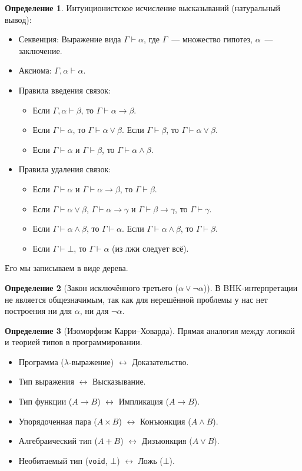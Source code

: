 \documentclass[a4paper,11pt]{article}
\theoremstyle{definition}
\newtheorem*{dfn}{Определение}
\newcommand{\proves}{\vdash}
\begin{document}
\begin{dfn}
Интуиционистское исчисление высказываний (натуральный вывод):
\begin{itemize}
\item Секвенция: Выражение вида $\Gamma \proves \alpha$, где $\Gamma$~---
  множество гипотез, $\alpha$~--- заключение.
\item Аксиома: $\Gamma, \alpha \proves \alpha$.
\item Правила введения связок:
  \begin{itemize}
  \item Если $\Gamma, \alpha \proves \beta$, то $\Gamma \proves \alpha \to \beta$.
  \item Если $\Gamma \proves \alpha$, то $\Gamma \proves \alpha \vee \beta$. Если
    $\Gamma \proves \beta$, то $\Gamma \proves \alpha \vee \beta$.
  \item Если $\Gamma \proves \alpha$ и $\Gamma \proves \beta$, то $\Gamma
    \proves \alpha \wedge \beta$.
  \end{itemize}
\item Правила удаления связок:
  \begin{itemize}
  \item Если $\Gamma \proves \alpha$ и $\Gamma \proves \alpha \to \beta$, то
    $\Gamma \proves \beta$.
  \item Если $\Gamma \proves \alpha \vee \beta$, $\Gamma \proves \alpha \to
    \gamma$ и $\Gamma \proves \beta \to \gamma$, то $\Gamma \proves \gamma$.
  \item Если $\Gamma \proves \alpha \wedge \beta$, то $\Gamma \proves \alpha$.
    Если $\Gamma \proves \alpha \wedge \beta$, то $\Gamma \proves \beta$.
  \item Если $\Gamma \proves \bot$, то $\Gamma \proves \alpha$ (из лжи следует
    всё).
  \end{itemize}
\end{itemize}
Его мы записываем в виде дерева.
\end{dfn}
\begin{dfn}[Закон исключённого третьего ($\alpha \vee \neg\alpha$)]
В BHK-интерпретации не является общезначимым, так как для нерешённой проблемы у
нас нет построения ни для $\alpha$, ни для $\neg\alpha$.
\end{dfn}
\begin{dfn}[Изоморфизм Карри--Ховарда]
Прямая аналогия между логикой и теорией типов в программировании.
\begin{itemize}
\item Программа ($\lambda$-выражение) $\leftrightarrow$ Доказательство.
\item Тип выражения $\leftrightarrow$ Высказывание.
\item Тип функции ($A \to B$) $\leftrightarrow$ Импликация ($A \to B$).
\item Упорядоченная пара ($A \times B$) $\leftrightarrow$ Конъюнкция ($A \wedge B$).
\item Алгебраический тип ($A + B$) $\leftrightarrow$ Дизъюнкция ($A \vee B$).
\item Необитаемый тип (\texttt{void}, $\bot$) $\leftrightarrow$ Ложь ($\bot$).
\end{itemize}
\end{dfn}
\end{document}
